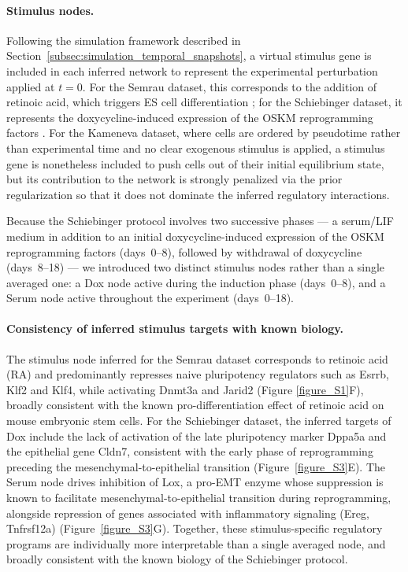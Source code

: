 \documentclass[a4paper, 11pt]{article}
\theoremstyle{plain}
\theoremstyle{remark}
\begin{document}
\begin{appendices}
\paragraph{Stimulus nodes.} Following the simulation framework described in 
Section~\ref{subsec:simulation_temporal_snapshots}, a virtual stimulus gene is included in each 
inferred network to represent the experimental perturbation applied at $t=0$. 
For the Semrau dataset, this corresponds to the addition of retinoic acid, which 
triggers ES cell differentiation \cite{Semrau_2017}; for the Schiebinger dataset, 
it represents the doxycycline-induced expression of the OSKM reprogramming 
factors \cite{schiebinger2019optimal}. For the Kameneva dataset, where cells are 
ordered by pseudotime rather than experimental time and no clear exogenous 
stimulus is applied, a stimulus gene is nonetheless included to push cells out of 
their initial equilibrium state, but its contribution to the network is strongly 
penalized via the prior regularization so that it does not dominate the inferred 
regulatory interactions.

Because the Schiebinger protocol involves two successive phases --- a serum/LIF medium in addition to an initial 
doxycycline-induced expression of the OSKM reprogramming factors (days~0--8), 
followed by withdrawal of doxycycline (days~8--18) \cite{schiebinger2019optimal} --- we introduced two 
distinct stimulus nodes rather than a single averaged one: a Dox node active 
during the induction phase (days~0--8), and a Serum node active throughout the 
experiment (days~0--18).

\paragraph{Consistency of inferred stimulus targets with known biology.} 
The stimulus node inferred for the Semrau dataset corresponds to retinoic acid 
(RA) and predominantly represses naive pluripotency regulators such as Esrrb, 
Klf2 and Klf4, while activating Dnmt3a and Jarid2 (Figure \ref{figure_S1}F), 
broadly consistent with the known pro-differentiation effect of retinoic acid on 
mouse embryonic stem cells. For the Schiebinger dataset, the inferred targets of 
Dox include the lack of activation of the late pluripotency marker Dppa5a and the 
epithelial gene Cldn7, consistent with the early phase of reprogramming preceding 
the mesenchymal-to-epithelial transition (Figure~\ref{figure_S3}E). The Serum 
node drives inhibition of Lox, a pro-EMT enzyme whose suppression is known to 
facilitate mesenchymal-to-epithelial transition during reprogramming, alongside 
repression of genes associated with inflammatory signaling (Ereg, Tnfrsf12a) 
(Figure~\ref{figure_S3}G). Together, these stimulus-specific regulatory programs 
are individually more interpretable than a single averaged node, and broadly 
consistent with the known biology of the Schiebinger protocol.


\end{appendices}
\end{document}
